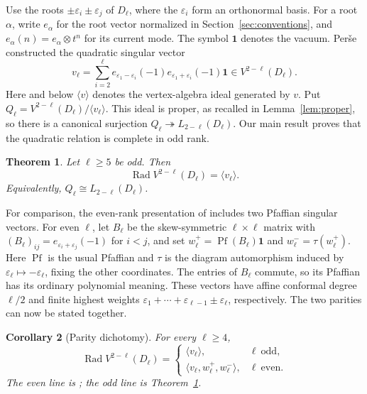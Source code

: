 \documentclass[11pt]{article}
\newtheorem{theorem}{Theorem}[section]
\newtheorem{corollary}[theorem]{Corollary}
\begin{document}
Use the roots $\pm\varepsilon_i\pm\varepsilon_j$ of $D_\ell$, where the
$\varepsilon_i$ form an orthonormal basis.  For a root $\alpha$, write
$e_\alpha$ for the root vector normalized in Section~\ref{sec:conventions},
and $e_\alpha(n)=e_\alpha\otimes t^n$ for its current mode.  The symbol
$\mathbf1$ denotes the vacuum.  Per\v{s}e
\cite[Theorem~3.1]{PerseD} constructed the quadratic singular vector
\begin{equation}\label{eq:vell}
 v_\ell=\sum_{i=2}^{\ell}
 e_{\varepsilon_1-\varepsilon_i}(-1)
 e_{\varepsilon_1+\varepsilon_i}(-1)\mathbf1
 \in V^{2-\ell}(D_\ell).
\end{equation}
Here and below $\langle v\rangle$ denotes the vertex-algebra ideal generated
by $v$.  Put $Q_\ell=V^{2-\ell}(D_\ell)/\langle v_\ell\rangle$.
This ideal is proper, as recalled in Lemma~\ref{lem:proper}, so there is a
canonical surjection $Q_\ell\twoheadrightarrow L_{2-\ell}(D_\ell)$.
Our main result proves that the quadratic relation is complete in odd rank.

\begin{theorem}\label{thm:main}
Let $\ell\ge5$ be odd.  Then
$$
 \operatorname{Rad}V^{2-\ell}(D_\ell)=\langle v_\ell\rangle.
$$
Equivalently, $Q_\ell\cong L_{2-\ell}(D_\ell)$.
\end{theorem}

For comparison, the even-rank presentation of
\cite[\S8.2, Theorem~8.6]{AKMPP} includes two Pfaffian singular vectors.
For even $\ell$, let $B_\ell$ be the skew-symmetric $\ell\times\ell$ matrix
with $(B_\ell)_{ij}=e_{\varepsilon_i+\varepsilon_j}(-1)$ for $i<j$, and set
$w_\ell^+=\operatorname{Pf}(B_\ell)\mathbf1$ and
$w_\ell^-=\tau(w_\ell^+)$.
Here $\operatorname{Pf}$ is the usual Pfaffian and $\tau$ is the diagram
automorphism induced by $\varepsilon_\ell\mapsto-\varepsilon_\ell$, fixing
the other coordinates.  The entries of $B_\ell$ commute, so its Pfaffian
has its ordinary polynomial meaning.  These vectors have affine conformal
degree $\ell/2$ and finite highest weights
$\varepsilon_1+\cdots+\varepsilon_{\ell-1}\pm\varepsilon_\ell$,
respectively.  The two parities can now be stated together.

\begin{corollary}[Parity dichotomy]\label{cor:parity-intro}
For every $\ell\ge4$,
$$
 \operatorname{Rad}V^{2-\ell}(D_\ell)=
 \begin{cases}
   \langle v_\ell\rangle, & \ell\ \text{odd},\\[1mm]
   \langle v_\ell,w_\ell^+,w_\ell^-\rangle, & \ell\ \text{even}.
 \end{cases}
$$
The even line is \cite[Theorem~8.6]{AKMPP}; the odd line is
Theorem~\ref{thm:main}.
\end{corollary}
\end{document}

